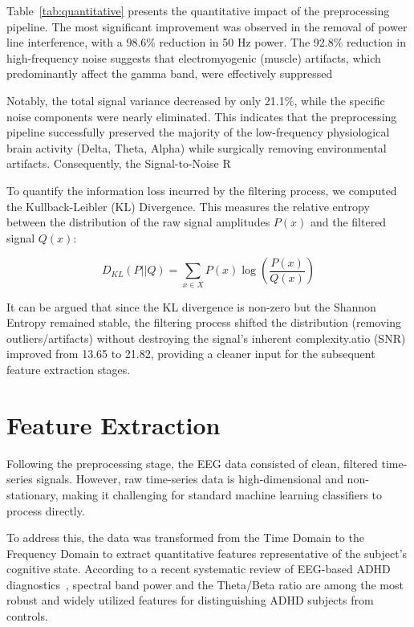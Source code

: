 \documentclass[11pt,a4paper]{article}
\begin{document}
Table~\ref{tab:quantitative} presents the quantitative impact of the preprocessing pipeline. The most significant improvement was observed in 
the removal of power line interference, with a 98.6\% reduction in 50 Hz power. The 92.8\% reduction in high-frequency noise suggests that 
electromyogenic (muscle) artifacts, which predominantly affect the gamma band, were effectively suppressed

Notably, the total signal variance decreased by only 21.1\%, while the specific noise components were nearly eliminated. This indicates that 
the preprocessing pipeline successfully preserved the majority of the low-frequency physiological brain activity (Delta, Theta, Alpha) while 
surgically removing environmental artifacts. Consequently, the Signal-to-Noise R

To quantify the information loss incurred by the filtering process, we computed the Kullback-Leibler (KL) Divergence. This measures the relative 
entropy between the distribution of the raw signal amplitudes $P(x)$ and the filtered signal $Q(x)$:

$$D_{KL}(P || Q) = \sum_{x \in X} P(x) \log \left( \frac{P(x)}{Q(x)} \right)$$

It can be argued that since the KL divergence is non-zero but the Shannon Entropy remained stable, the filtering process shifted the 
distribution (removing outliers/artifacts) without destroying the signal's inherent complexity.atio (SNR) improved from 13.65 to 21.82, providing a 
cleaner input for the subsequent feature extraction stages.


\section{Feature Extraction}\label{sec:features}
Following the preprocessing stage, the EEG data consisted of clean, filtered time-series signals. However, raw time-series data is 
high-dimensional and non-stationary, making it challenging for standard machine learning classifiers to process directly.

To address this, the data was transformed from the Time Domain to the Frequency Domain to extract quantitative features representative of the 
subject's cognitive state. According to a recent systematic review of EEG-based ADHD diagnostics~\cite{arpaia2022systematic}, spectral band 
power and the Theta/Beta ratio are among the most robust and widely utilized features for distinguishing ADHD subjects from controls.
\end{document}

